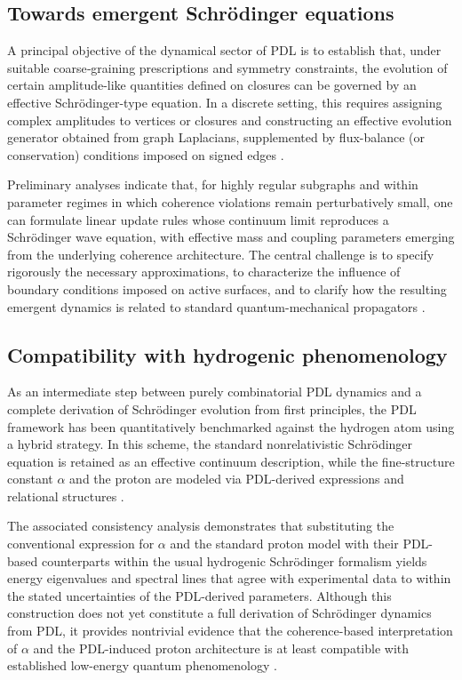 \documentclass{article}
\begin{document}
\subsection{Towards emergent Schr\"odinger equations}
\label{subsec:emergent_schrodinger}

A principal objective of the dynamical sector of PDL is to establish that, under suitable coarse‑graining prescriptions and symmetry constraints, the evolution of certain amplitude-like quantities defined on closures can be governed by an effective Schr\"odinger-type equation. In a discrete setting, this requires assigning complex amplitudes to vertices or closures and constructing an effective evolution generator obtained from graph Laplacians, supplemented by flux-balance (or conservation) conditions imposed on signed edges \citep{Coherence_Leakage_18_2026,Coherence_Leakage_18_2026}.

Preliminary analyses indicate that, for highly regular subgraphs and within parameter regimes in which coherence violations remain perturbatively small, one can formulate linear update rules whose continuum limit reproduces a Schr\"odinger wave equation, with effective mass and coupling parameters emerging from the underlying coherence architecture. The central challenge is to specify rigorously the necessary approximations, to characterize the influence of boundary conditions imposed on active surfaces, and to clarify how the resulting emergent dynamics is related to standard quantum-mechanical propagators \citep{Coherence_Leakage_18_2026,PDL_position}.

\subsection{Compatibility with hydrogenic phenomenology}
\label{subsec:hydrogen_compatibility}

As an intermediate step between purely combinatorial PDL dynamics and a complete derivation of Schrödinger evolution from first principles, the PDL framework has been quantitatively benchmarked against the hydrogen atom using a hybrid strategy. In this scheme, the standard nonrelativistic Schrödinger equation is retained as an effective continuum description, while the fine-structure constant \(\alpha\) and the proton are modeled via PDL-derived expressions and relational structures \citep{Schrodinger_Sketch_v2_2026}.

The associated consistency analysis demonstrates that substituting the conventional expression for \(\alpha\) and the standard proton model with their PDL-based counterparts within the usual hydrogenic Schrödinger formalism yields energy eigenvalues and spectral lines that agree with experimental data to within the stated uncertainties of the PDL-derived parameters. Although this construction does not yet constitute a full derivation of Schrödinger dynamics from PDL, it provides nontrivial evidence that the coherence-based interpretation of \(\alpha\) and the PDL-induced proton architecture is at least compatible with established low-energy quantum phenomenology \citep{Schrodinger_Sketch_v2_2026,PDL_position}.
\end{document}
